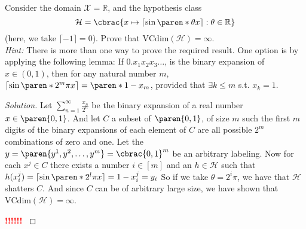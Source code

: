 \documentclass[10pt, a4paper, twoside]{amsart}
\theoremstyle{plain}
\newcommand{\R}{\ensuremath{\mathbb{R}}}
\DeclarePairedDelimiter\cbrac\{\}
\DeclarePairedDelimiter\paren()
\newcommand{\cH}{\ensuremath{\mathcal{H}}}
\newcommand{\cX}{\ensuremath{\mathcal{X}}}
\newenvironment{solution}
               {\let\oldqedsymbol=\qedsymbol
                \renewcommand{\qedsymbol}{$\blacktriangleleft$}
                \begin{proof}[Solution]}
               {\end{proof}
                \renewcommand{\qedsymbol}{\oldqedsymbol}}
\newcommand{\TODO}{\textcolor{red}{\textbf{!!!!!! }}}
\begin{document}
Consider the domain $\cX = \R$, and the hypothesis class
\begin{equation*}
  \cH = \cbrac{x \mapsto \left\lceil \sin\paren*{\theta x} \right\rceil : \theta \in \R }
\end{equation*}
(here, we take $\lceil -1 \rceil = 0$). Prove that $\text{VCdim}(\cH) = \infty$.\\
\textit{Hint:} There is more than one way to prove the required result. One option is by applying the following lemma: If $0 . x_1 x_2 x_3 \ldots$, is the binary expansion of $x \in (0,1)$, then for any natural number $m$, $\lceil \sin \paren*{2^m \pi x} \rceil = \paren*{1-x_m}$, provided that $\exists k \leq m$ s.t. $x_k =1$.
\begin{solution}
Let $\sum_{n=1}^{\infty} \frac{x_n}{2^n}$ be the binary expansion of a real number $x \in \paren{0,1}$. And let $C$ a subset of $\paren{0,1}$, of size $m$ such the first $m$ digits of the binary expansions of each element of $C$ are all possible $2^m$ combinations of zero and one. Let the $y = \paren{y^1,y^2, \ldots, y^m} =  \cbrac{0,1}^m$ be an arbitrary labeling. Now for each $x^j \in C$ there exists a number $i \in [m]$ and an $h \in \cH$ such that $h(x_i^j) = \lceil \sin \paren*{2^l \pi x}\rceil = 1-x_i^j = y_i $ So if we take $\theta = 2^i \pi$, we have that $\cH$ shatters $C$. And since $C$ can be of arbitrary large size, we have shown that $\text{VCdim}(\cH) = \infty$.

\TODO
\end{solution}
\end{document}
